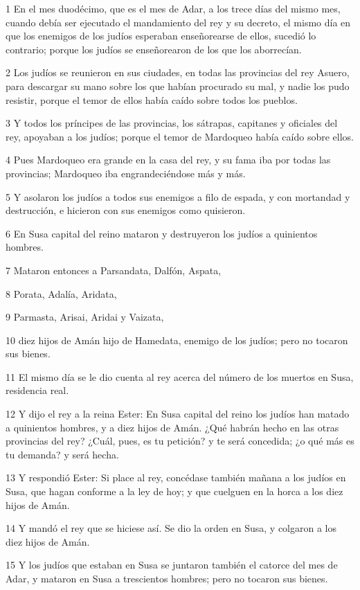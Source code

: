\par 1 En el mes duodécimo, que es el mes de Adar, a los trece días del mismo mes, cuando debía ser ejecutado el mandamiento del rey y su decreto, el mismo día en que los enemigos de los judíos esperaban enseñorearse de ellos, sucedió lo contrario; porque los judíos se enseñorearon de los que los aborrecían.
\par 2 Los judíos se reunieron en sus ciudades, en todas las provincias del rey Asuero, para descargar su mano sobre los que habían procurado su mal, y nadie los pudo resistir, porque el temor de ellos había caído sobre todos los pueblos.
\par 3 Y todos los príncipes de las provincias, los sátrapas, capitanes y oficiales del rey, apoyaban a los judíos; porque el temor de Mardoqueo había caído sobre ellos.
\par 4 Pues Mardoqueo era grande en la casa del rey, y su fama iba por todas las provincias; Mardoqueo iba engrandeciéndose más y más.
\par 5 Y asolaron los judíos a todos sus enemigos a filo de espada, y con mortandad y destrucción, e hicieron con sus enemigos como quisieron.
\par 6 En Susa capital del reino mataron y destruyeron los judíos a quinientos hombres.
\par 7 Mataron entonces a Parsandata, Dalfón, Aspata,
\par 8 Porata, Adalía, Aridata,
\par 9 Parmasta, Arisai, Aridai y Vaizata,
\par 10 diez hijos de Amán hijo de Hamedata, enemigo de los judíos; pero no tocaron sus bienes.
\par 11 El mismo día se le dio cuenta al rey acerca del número de los muertos en Susa, residencia real.
\par 12 Y dijo el rey a la reina Ester: En Susa capital del reino los judíos han matado a quinientos hombres, y a diez hijos de Amán. ¿Qué habrán hecho en las otras provincias del rey? ¿Cuál, pues, es tu petición? y te será concedida; ¿o qué más es tu demanda? y será hecha.
\par 13 Y respondió Ester: Si place al rey, concédase también mañana a los judíos en Susa, que hagan conforme a la ley de hoy; y que cuelguen en la horca a los diez hijos de Amán.
\par 14 Y mandó el rey que se hiciese así. Se dio la orden en Susa, y colgaron a los diez hijos de Amán.
\par 15 Y los judíos que estaban en Susa se juntaron también el catorce del mes de Adar, y mataron en Susa a trescientos hombres; pero no tocaron sus bienes.

